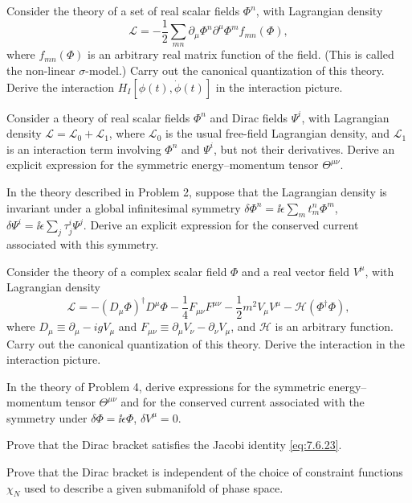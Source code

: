 
\begin{enumerate}
 Consider the theory of a set of real scalar fields $\Phi^n$, with
Lagrangian density
\[
  \mathcal{L}=-\frac12\sum_{mn}\partial_\mu\Phi^n\partial^\mu\Phi^m
  f_{mn}(\Phi),
\]
where $f_{mn}(\Phi)$ is an arbitrary real matrix function of the field. (This
is called the non-linear $\sigma$-model.) Carry out the canonical quantization
of this theory. Derive the interaction
$H_I[\phi(t),\dot\phi(t)]$ in the interaction picture.

 Consider a theory of real scalar fields $\Phi^n$ and Dirac fields
$\Psi^i$, with Lagrangian density $\mathcal{L}=\mathcal{L}_0+\mathcal{L}_1$,
where $\mathcal{L}_0$ is the usual free-field Lagrangian density, and
$\mathcal{L}_1$ is an interaction term involving $\Phi^n$ and $\Psi^i$,
but not their derivatives. Derive an explicit expression for the symmetric
energy--momentum tensor $\Theta^{\mu\nu}$.

 In the theory described in Problem 2, suppose that the Lagrangian
density is invariant under a global infinitesimal symmetry
$\delta\Phi^n=\ii\epsilon\sum_m t^n_m\Phi^m$,
$\delta\Psi^i=\ii\epsilon\sum_j\tau^i_j\Psi^j$. Derive an explicit expression
for the conserved current associated with this symmetry.

 Consider the theory of a complex scalar field $\Phi$ and a real vector
field $V^\mu$, with Lagrangian density
\[
  \mathcal{L}=-(D_\mu\Phi)^\dagger D^\mu\Phi
  -\frac14F_{\mu\nu}F^{\mu\nu}
  -\frac12m^2V_\mu V^\mu-\mathcal{H}(\Phi^\dagger\Phi),
\]
where $D_\mu\equiv\partial_\mu-igV_\mu$ and
$F_{\mu\nu}\equiv\partial_\mu V_\nu-\partial_\nu V_\mu$, and $\mathcal{H}$
is an arbitrary function. Carry out the canonical quantization of this
theory. Derive the interaction in the interaction picture.

 In the theory of Problem 4, derive expressions for the symmetric
energy--momentum tensor $\Theta^{\mu\nu}$ and for the conserved current
associated with the symmetry under $\delta\Phi=\ii\epsilon\Phi$,
$\delta V^\mu=0$.

 Prove that the Dirac bracket satisfies the Jacobi identity \eqref{eq:7.6.23}.

 Prove that the Dirac bracket is independent of the choice of constraint
functions $\chi_N$ used to describe a given submanifold of phase space.
\end{enumerate}
